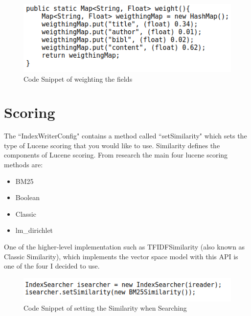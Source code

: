	\begin{figure}[ht!]
		\begin{center}
			\includegraphics[scale=.4]{4} 
			\caption{Code Snippet of weighting the fields}
			\label{fig:1}
		\end{center}
	\end{figure} \par

\newpage
\section{Scoring}

The ``IndexWriterConfig" contains a method called ``setSimilarity" which sets the type of Lucene scoring that you would like to use. Similarity defines the components of Lucene scoring. From research the main four lucene scoring methods are: \par
		
	\begin{multicols}{2}
		\begin{itemize}
			\item BM25
			\item Boolean
			\item Classic
			\item lm\_dirichlet
		\end{itemize}
	\end{multicols}
	
One of the higher-level implementation such as TFIDFSimilarity (also known as Classic Similarity), which implements the vector space model with this API is one of the four I decided to use. \par 

	\begin{figure}[ht!]
		\begin{center}
			\includegraphics[scale=.5 ]{5} 
			\caption{Code Snippet of setting the Similarity when Searching}
			\label{fig:1}
		\end{center}
	\end{figure} \par

